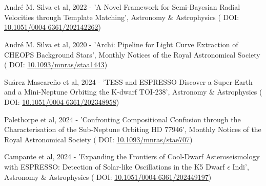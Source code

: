 \section{}


\vspace*{0.2cm}

  André M. Silva et al, 2022 - 'A Novel Framework for Semi-{{Bayesian}} Radial Velocities through Template Matching', Astronomy \& Astrophysics (\textcolor{MarkerColour!80!black}{\scriptsize\faLink} DOI: \href{http://dx.doi.org/10.1051/0004-6361/202142262}{10.1051/0004-6361/202142262})

\vspace*{0.3cm}

  André M. Silva et al, 2020 - 'Archi: Pipeline for Light Curve Extraction of {{CHEOPS}} Background Stars', Monthly Notices of the Royal Astronomical Society (\textcolor{MarkerColour!80!black}{\scriptsize\faLink} DOI: \href{http://dx.doi.org/10.1093/mnras/staa1443}{10.1093/mnras/staa1443})

\vspace*{0.3cm}

\vspace*{0.2cm}


\vspace*{0.2cm}

  Su{\'a}rez Mascare{\~n}o et al, 2024 - '{{TESS}} and {{ESPRESSO}} Discover a Super-{{Earth}} and a Mini-{{Neptune}} Orbiting the {{K-dwarf TOI-238}}', Astronomy \& Astrophysics ( \textcolor{MarkerColour!80!black}{\scriptsize\faLink} DOI: \href{http://dx.doi.org/10.1051/0004-6361/202348958}{10.1051/0004-6361/202348958})

\vspace*{0.3cm}

  Palethorpe et al, 2024 - 'Confronting Compositional Confusion through the Characterisation of the Sub-{{Neptune}} Orbiting {{HD}} 77946', Monthly Notices of the Royal Astronomical Society ( \textcolor{MarkerColour!80!black}{\scriptsize\faLink} DOI: \href{http://dx.doi.org/10.1093/mnras/stae707}{10.1093/mnras/stae707})

\vspace*{0.3cm}

  Campante et al, 2024 - 'Expanding the Frontiers of Cool-Dwarf Asteroseismology with {{ESPRESSO}}: {{Detection}} of Solar-like Oscillations in the {{K5}} Dwarf {\emph{{$\epsilon$}}} {{Indi}}', Astronomy \& Astrophysics ( \textcolor{MarkerColour!80!black}{\scriptsize\faLink} DOI: \href{http://dx.doi.org/10.1051/0004-6361/202449197}{10.1051/0004-6361/202449197})

